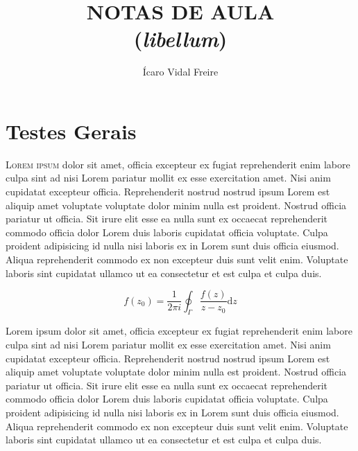 \documentclass[12pt]{../libellum}
\title{
  \sffamily \bfseries
  NOTAS DE AULA \\
  (\textit{libellum})
}
\author{
  \sffamily
  Ícaro Vidal Freire
}
\date{
  \sffamily 
  2023
}
\begin{document}
 
  \maketitle
%
  \blinddocument
%
  \blindtext {}
  
  \chapter{Testes Gerais}
   \lettrine[lines=3]{\initial\color{azulUFRB} L}{orem ipsum} dolor sit amet, officia excepteur ex fugiat reprehenderit enim labore culpa sint ad nisi Lorem pariatur mollit ex esse exercitation amet. Nisi anim cupidatat excepteur officia. Reprehenderit nostrud nostrud ipsum Lorem est aliquip amet voluptate voluptate dolor minim nulla est proident. Nostrud officia pariatur ut officia. Sit irure elit esse ea nulla sunt ex occaecat reprehenderit commodo officia dolor Lorem duis laboris cupidatat officia voluptate. Culpa proident adipisicing id nulla nisi laboris ex in Lorem sunt duis officia eiusmod. Aliqua reprehenderit commodo ex non excepteur duis sunt velit enim. Voluptate laboris sint cupidatat ullamco ut ea consectetur et est culpa et culpa duis.



     \[
       f(z_0) = \frac{1}{2 \pi i} \oint_{\Gamma} \frac{f(z)}{z - z_0} \mathrm{d} z
     \]
  
  Lorem ipsum dolor sit amet, officia excepteur ex fugiat reprehenderit enim labore culpa sint ad nisi Lorem pariatur mollit ex esse exercitation amet. Nisi anim cupidatat excepteur officia. Reprehenderit nostrud nostrud ipsum Lorem est aliquip amet voluptate voluptate dolor minim nulla est proident. Nostrud officia pariatur ut officia. Sit irure elit esse ea nulla sunt ex occaecat reprehenderit commodo officia dolor Lorem duis laboris cupidatat officia voluptate. Culpa proident adipisicing id nulla nisi laboris ex in Lorem sunt duis officia eiusmod. Aliqua reprehenderit commodo ex non excepteur duis sunt velit enim. Voluptate laboris sint cupidatat ullamco ut ea consectetur et est culpa et culpa duis.
\end{document}
